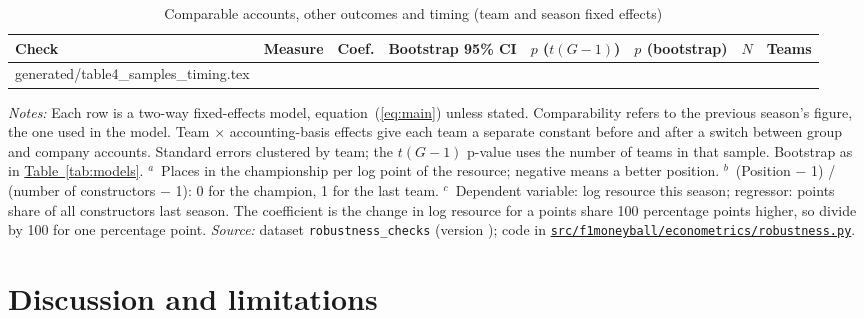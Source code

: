 \documentclass[11pt,a4paper]{article}
\newcommand{\repo}{https://github.com/NahianIbnat-2000/F1-moneyball}
\newcommand{\code}[1]{\href{\repo/blob/main/#1}{\nolinkurl{#1}}}
\begin{document}
\begin{table}[htbp]
\centering
\begin{threeparttable}
\caption{Comparable accounts, other outcomes and timing (team and season fixed effects)}
\label{tab:samples}
\footnotesize
\begin{tabular}{@{}>{\raggedright\arraybackslash}p{3.9cm}lrcccrr@{}}
\toprule
Check & Measure & Coef. & Bootstrap 95\% CI & $p$ ($t(G-1)$) & $p$ (bootstrap) & $N$ & Teams \\
\midrule
{} generated/table4_samples_timing.tex 
\bottomrule
\end{tabular}
\begin{tablenotes}[flushleft]\footnotesize
\item \textit{Notes:} Each row is a two-way fixed-effects model, equation~(\ref{eq:main}) unless stated. Comparability
refers to the previous season's figure, the one used in the model. Team $\times$ accounting-basis effects give each team a
separate constant before and after a switch between group and company accounts. Standard errors clustered by team; the
$t(G-1)$ p-value uses the number of teams in that sample. Bootstrap as in \hyperref[tab:models]{Table~\ref*{tab:models}}.
$^{a}$~Places in the championship per log point of the resource; negative means a better position.
$^{b}$~(Position $-$ 1) / (number of constructors $-$ 1): 0 for the champion, 1 for the last team.
$^{c}$~Dependent variable: log resource this season; regressor: points share of all constructors last season. The
coefficient is the change in log resource for a points share 100 percentage points higher, so divide by 100 for one
percentage point.
\textit{Source:} dataset \texttt{robustness\_checks} (version \VerRobustnessChecks); code in
\code{src/f1moneyball/econometrics/robustness.py}.
\end{tablenotes}
\end{threeparttable}
\end{table}

\section{Discussion and limitations}
\label{sec:discussion}
\end{document}
